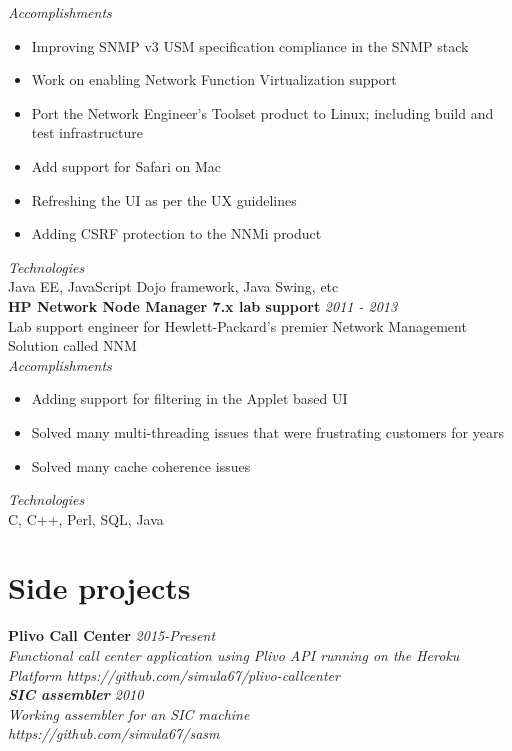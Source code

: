 \documentclass[line,margin]{res}
\begin{document}
\begin{resume}
{\it{Accomplishments}}\\
\begin{itemize}
\item Improving SNMP v3 USM specification compliance in the SNMP stack
\item Work on enabling Network Function Virtualization support
\item Port the Network Engineer's Toolset product to Linux; including build and test infrastructure
\item Add support for Safari on Mac
\item Refreshing the UI as per the UX guidelines
\item Adding CSRF protection to the NNMi product
\end{itemize}

{\it{Technologies}}\\
Java EE, JavaScript Dojo framework, Java Swing, etc\\

{\bf HP Network Node Manager 7.x lab support} \hfill {\it{2011 - 2013}}\\
Lab support engineer for Hewlett-Packard's premier Network Management Solution called NNM\\

{\it{Accomplishments}}\\
\begin{itemize}
\item Adding support for filtering in the Applet based UI
\item Solved many multi-threading issues that were frustrating customers for years
\item Solved many cache coherence issues
\end{itemize}

{\it{Technologies}}\\
C, C++, Perl, SQL, Java

\section{Side projects}
{\bf Plivo Call Center} \hfill \it{2015-Present}\\
Functional call center application using Plivo API running on the Heroku Platform
https://github.com/simula67/plivo-callcenter\\

{\bf SIC assembler} \hfill \it{2010}\\ 
Working assembler for an SIC machine\\
https://github.com/simula67/sasm\\


\end{resume}
\end{document}
